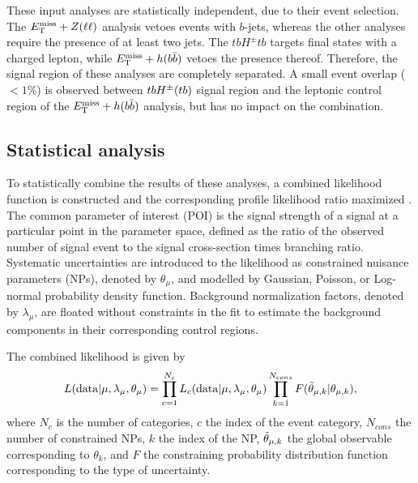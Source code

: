 These input analyses are statistically independent, due to their event selection. The $E_{\mathrm{T}}^{\mathrm{miss}}+Z(\ell\ell)$ analysis vetoes events with $b$-jets, whereas the other analyses require the presence of at least two jets. The $tbH^{\pm}tb$ targets final states with a charged lepton, while $E_{\mathrm{T}}^{\mathrm{miss}}+h(b\bar{b})$ vetoes the presence thereof. Therefore, the signal region of these analyses are completely separated. A small event overlap ($<1\%$) is observed between $tbH^{\pm}(tb)$ signal region and the leptonic control region of the $E_{\mathrm{T}}^{\mathrm{miss}}+h(b\bar{b})$ analysis, but has no impact on the combination.

\subsection{Statistical analysis}

To statistically combine the results of these analyses, a combined likelihood function is constructed and the corresponding profile likelihood ratio maximized \cite{Cowan:2010js}. The common parameter of interest (POI) is the signal strength of a \thdma signal at a particular point in the parameter space, defined as the ratio of the observed number of signal event to the signal cross-section times branching ratio. Systematic uncertainties are introduced to the likelihood as constrained nuisance parameters (NPs), denoted by $\theta_{\mu}$, and modelled by Gaussian, Poisson, or Log-normal probability density function. Background normalization factors, denoted by $\lambda_{\mu}$, are floated without constraints in the fit to estimate the background components in their corresponding control regions. 

The combined likelihood is given by
\begin{equation}
    \label{4.13}
    L(\mathrm{data}|\mu,\lambda_{\mu},\theta_{\mu})= \prod_{c=1}^{N_c} {L}_c(\mathrm{data}|\mu, \lambda_{\mu}, \theta_{\mu}) \prod_{k=1}^{N_{cons}} {F}(\Tilde{\theta}_{\mu, k}|\theta_{\mu, k}),
\end{equation}
where $N_c$ is the number of categories, $c$ the index of the event category, $N_{cons}$ the number of constrained NPs, $k$ the index of the NP, $\Tilde{\theta}_{\mu, k}$ the global observable corresponding to $\theta_k$, and $F$ the constraining probability distribution function corresponding to the type of uncertainty. 


